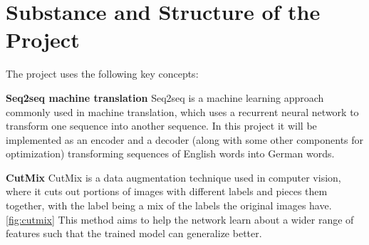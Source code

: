 \documentclass[60pt]{article}
\begin{document}
\section{Substance and Structure of the Project}
\par
The project uses the following key concepts:
\par
\textbf{Seq2seq machine translation} Seq2seq is a machine learning approach commonly used in machine translation, which uses a recurrent neural network to transform one sequence into another sequence. In this project it will be implemented as an encoder and a decoder (along with some other components for optimization) transforming sequences of English words into German words.
\par
\textbf{CutMix} CutMix is a data augmentation technique used in computer vision, where it cuts out portions of images with different labels and pieces them together, with the label being a mix of the labels the original images have. \ref{fig:cutmix} This method aims to help the network learn about a wider range of features such that the trained model can generalize better.
\end{document}
